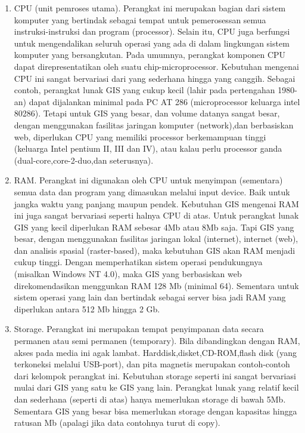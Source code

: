 \begin{enumerate}
\item CPU (unit pemroses utama). Perangkat ini merupakan bagian dari sistem komputer yang bertindak sebagai tempat untuk pemerosessan semua instruksi-instruksi dan program (processor). Selain itu, CPU juga berfungsi untuk mengendalikan seluruh operasi yang ada di dalam lingkungan sistem komputer yang bersangkutan. Pada umumnya, perangkat komponen CPU dapat direpresentatikan oleh suatu chip-microprocessor. Kebutuhan mengenai CPU ini sangat bervariasi dari yang sederhana hingga yang canggih. Sebagai contoh, perangkat lunak GIS yang cukup kecil (lahir pada pertengahan 1980-an) dapat dijalankan minimal pada PC AT 286 (microprocessor keluarga intel 80286). Tetapi untuk GIS yang besar, dan volume datanya sangat besar, dengan menggunakan fasilitas jaringan komputer (network),dan berbasiskan web, diperlukan CPU yang memiliki processor berkemampuan tinggi (keluarga Intel pentium II, III dan IV), atau kalau perlu processor ganda (dual-core,core-2-duo,dan seterusnya). 

\item RAM. Perangkat ini digunakan oleh CPU untuk menyimpan (sementara) semua data dan program yang dimasukan melalui input device. Baik untuk jangka waktu yang panjang maupun pendek. Kebutuhan GIS mengenai RAM ini juga sangat bervariasi seperti halnya CPU di atas. Untuk perangkat lunak GIS yang kecil diperlukan RAM sebesar 4Mb atau 8Mb saja. Tapi GIS yang besar, dengan menggunakan fasilitas jaringan lokal (internet), internet (web), dan analisis spasial (raster-based), maka kebutuhan GIS akan RAM menjadi cukup tinggi. Dengan memperhatikan sistem operasi pendukungnya (misalkan Windows NT 4.0), maka GIS yang berbasiskan web direkomendasikan menggunkan RAM 128 Mb (minimal 64). Sementara untuk sistem operasi yang lain dan bertindak sebagai server bisa jadi RAM yang diperlukan antara 512 Mb hingga 2 Gb. 

\item Storage. Perangkat ini merupakan tempat penyimpanan data secara permanen atau semi permanen (temporary). Bila dibandingkan dengan RAM, akses pada media ini agak lambat. Harddisk,disket,CD-ROM,flash disk (yang terkoneksi melalui USB-port), dan pita magnetis merupakan contoh-contoh dari kelompok perangkat ini. Kebutuhan storage seperti ini sangat bervariasi mulai dari GIS yang satu ke GIS yang lain. Perangkat lunak yang relatif kecil dan sederhana (seperti di atas) hanya memerlukan storage di bawah 5Mb. Sementara GIS yang besar bisa memerlukan storage dengan kapasitas hingga ratusan Mb (apalagi jika data contohnya turut di copy).


\end{enumerate}
